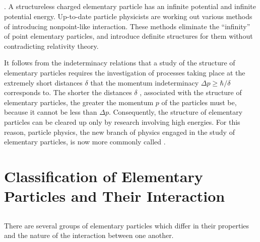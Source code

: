 \subsection{}\label{43.1.3}. A structureless charged elementary particle has an infinite potential  and infinite potential energy. Up-to-date particle physicists are working out various methods of introducing nonpoint-like interaction. These methods eliminate the ``infinity'' of point elementary particles, and introduce definite structures for them without contradicting relativity theory.

It follows from the indeterminacy relations  that a study of the structure of elementary particles requires the investigation of processes taking place at the extremely short distances $\delta$ that the momentum indeterminacy $\Delta p \geqslant \hbar/ \delta$ corresponds
to. The shorter the distances $\delta$ , associated with the structure of elementary particles, the greater the momentum $p$ of the particles must be, because it cannot be less than $\Delta p$. Consequently, the structure of elementary particles can be cleared up only by research involving high energies. For this reason, particle physics, the new branch of physics engaged in the study of elementary particles, is now more commonly called .

\section{Classification of Elementary Particles and Their
Interaction}
\label{sec-43.2} 


\subsection{}\label{43.2.1} There are several groups of elementary particles which differ in their properties and the nature of the interaction between one another.

